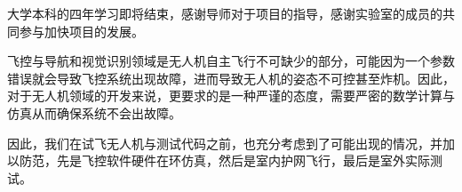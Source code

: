\begin{thanksfor}
大学本科的四年学习即将结束，感谢导师对于项目的指导，感谢实验室的成员的共同参与加快项目的发展。

飞控与导航和视觉识别领域是无人机自主飞行不可缺少的部分，可能因为一个参数错误就会导致飞控系统出现故障，进而导致无人机的姿态不可控甚至炸机。因此，对于无人机领域的开发来说，更要求的是一种严谨的态度，需要严密的数学计算与仿真从而确保系统不会出故障。

因此，我们在试飞无人机与测试代码之前，也充分考虑到了可能出现的情况，并加以防范，先是飞控软件硬件在环仿真，然后是室内护网飞行，最后是室外实际测试。
\end{thanksfor}